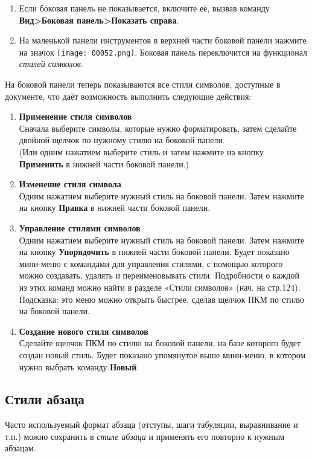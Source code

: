 \documentclass[a4paper,10pt]{article}
\begin{document}
\begin{enumerate}
 \item Если боковая панель не показывается, включите её, вызвав команду \textbf{Вид>Боковая панель>Показать справа}.
 \item На маленькой панели инструментов в верхней части боковой панели нажмите на значок \texttt{[image: 00052.png]}. Боковая панель переключится на функционал \textit{стилей символов}. 
\end{enumerate}

На боковой панели теперь показываются все стили символов, доступные в документе, что даёт возможность выполнить следующие действия:

\begin{enumerate}
 \item \textbf{Применение стиля символов}\\
 Сначала выберите символы, которые нужно форматировать, затем сделайте двойной щелчок по нужному стилю на боковой панели.\\
 (Или одним нажатием выберите стиль и затем нажмите на кнопку \textbf{Применить} в нижней части боковой панели.)
 \item \textbf{Изменение стиля символа}\\
 Одним нажатием выберите нужный стиль на боковой панели. Затем нажмите на кнопку \textbf{Правка} в нижней части боковой панели.
 \item \textbf{Управление стилями символов}\\
 Одним нажатием выберите нужный стиль на боковой панели. Затем нажмите на кнопку \textbf{Упорядочить} в нижней части боковой панели.
 Будет показано мини-меню с командами для управления стилями, с помощью которого можно создавать, удалять и переименовывать стили. Подробности о каждой из этих команд можно найти в разделе «Стили символов» (нач. на стр.124).\\
 Подсказка: это меню можно открыть быстрее, сделав щелчок ПКМ по стилю на боковой панели.
 \item \textbf{Создание нового стиля символов}\\
 Сделайте щелчок ПКМ по стилю на боковой панели, на базе которого будет создан новый стиль. Будет показано упомянутое выше мини-меню, в котором нужно выбрать команду \textbf{Новый}.
\end{enumerate}

\subsection{Стили абзаца}
Часто используемый формат абзаца (отступы, шаги табуляции, выравнивание и т.п.) можно сохранить в \textit{стиле абзаца} и применять его повторно к нужным абзацам.
\end{document}
